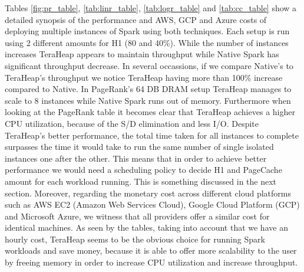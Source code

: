 Tables \ref{fig:pr_table}, \ref{tab:linr_table}, \ref{tab:logr_table}
and \ref{tab:cc_table} show a detailed synopsis of the performance and
AWS, GCP and Azure costs of deploying multiple instances of Spark
using both techniques. Each setup is run using 2 different amounts for
H1 (80 and 40\%). While the number of instances increases TeraHeap
appears to maintain throughput while Native Spark has significant
throughput decrease. In several occassions, if we compare Native's to
TeraHeap's throughput we notice TeraHeap having more than 100\%
increase compared to Native. In PageRank's 64 DB DRAM setup TeraHeap
manages to scale to 8 instances while Native Spark runs out of memory.
Furthermore when looking at the PageRank table it becomes clear that
TeraHeap achieves a higher CPU utilization, because of the S/D
elimination and less I/O. Despite TeraHeap's better performance, the
total time taken for all instances to complete surpasses the time it
would take to run the same number of single isolated instances one
after the other. This means that in order to achieve better
performance we would need a scheduling policy to decide H1 and
PageCache amount for each workload running. This is something
discussed in the next section. Moreover, regarding the monetary cost
across different cloud platforms such as AWS EC2 (Amazon Web Services
Cloud), Google Cloud Platform (GCP) and Microsoft Azure, we witness
that all providers offer a similar cost for identical machines. As
seen by the tables, taking into account that we have an hourly cost,
TeraHeap seems to be the obvious choice for running Spark workloads
and save money, because it is able to offer more scalability to the
user by freeing memory in order to increase CPU utilization and
increase throughput. 
